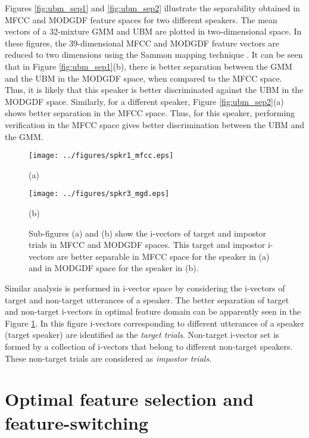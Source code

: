 \documentclass{article}
\begin{document}
Figures \ref{fig:ubm_sep1} and \ref{fig:ubm_sep2} illustrate the
separability obtained in MFCC and MODGDF feature spaces for two different
speakers. The mean vectors of a 32-mixture GMM and UBM are plotted in
two-dimensional space. In these figures, the 39-dimensional MFCC and MODGDF
feature vectors are reduced to two dimensions using the Sammon mapping technique
\cite{sammon}. It can be seen that in Figure \ref{fig:ubm_sep1}(b), there is
better separation between the GMM and the UBM in the MODGDF space, when compared
to the MFCC space. Thus, it is likely that this speaker is better discriminated
against the UBM in the MODGDF space. Similarly, for a different speaker, 
Figure \ref{fig:ubm_sep2}(a) shows better separation in the MFCC space. Thus,
for this speaker, performing verification in the MFCC space gives better
discrimination between the UBM and the GMM. 

\begin{figure}[h!tb]
\centering \hspace{-5cm}
\begin{minipage}{0.65\textwidth}
\centering 
\texttt{[image: ../figures/spkr1\_mfcc.eps]}
\caption*{(a)}
\label{fig:subfig3}
\end{minipage}%
\begin{minipage}{0.25\textwidth}
\centering \hspace{10cm}
\texttt{[image: ../figures/spkr3\_mgd.eps]}
\caption*{(b)}
\label{fig:subfig4}
\end{minipage}
\caption{Sub-figures (a) and (b) show the i-vectors of target and impostor trials in MFCC and MODGDF spaces. This target and impostor i-vectors are better separable in MFCC space for the speaker in (a) and in MODGDF space for the speaker  in (b).}
\label{fig:ivec_separation}
\end{figure}

Similar analysis is performed in i-vector space by considering the i-vectors of target and non-target utterances of a speaker. The better separation of target and non-target i-vectors in optimal feature domain can be apparently seen in the Figure \ref{fig:ivec_separation}. In this figure i-vectors corresponding to different utterances of a speaker (target speaker) are identified as the \emph{target trials}. Non-target i-vector set is formed by a collection of i-vectors that belong to different non-target speakers. These non-target trials are considered as \emph{impostor trials}. 

\section{Optimal feature selection and feature-switching}
\label{sec:optFeat}
\end{document}
